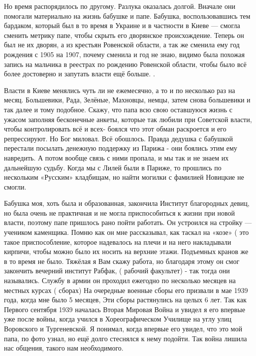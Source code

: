 Но время
распорядилось по другому. Разлука оказалась долгой. Вначале они помогали
материально на жизнь бабушке и папе. Бабушка, воспользовавшись тем бардаком,
который был в то время в  Украине и в частности в Киеве — смогла сменить
метрику папе, чтобы скрыть его дворянское происхождение. Теперь он был не их
дворян, а из крестьян Ровенской области, а так же сменила ему год рождения с
1905 на 1907, почему сменила  и год не знаю, видимо была похожая запись на
мальчика в реестрах по рождению Ровенской области, чтобы было всё более
достоверно и запутать власти ещё больше. . 

Власти в Киеве менялись чуть ли не ежемесячно, а то и по несколько раз на
месяц. Большевики, Рада, Зелёные, Махновцы, немцы, затем снова большевики и так
далее и тому подобное.  Скажу, что папа всю свою оставшуюся жизнь с ужасом
заполняя бесконечные анкеты, которые так любили при Советской власти, чтобы
контролировать всё и всех-  боялся что этот обман раскроется и его
репрессируют.  Но Бог миловал.  Всё обошлось. Правда дедушка с бабушкой
перестали посылать денежную поддержку из Парижа - они боялись этим ему
навредить. А потом вообще связь с ними пропала, и мы так и не знаем их
дальнейшую судьбу. Когда мы с Лилей были в Париже, то прошлись по нескольким
«Русским» кладбищам, но найти могилки с фамилией Новицкие не смогли.  

Бабушка моя, хоть была и образованная, закончила
Институт благородных девиц, но была очень не практичная  и не могла
приспособиться к жизни при новой власти, поэтому папе пришлось рано пойти
работать. Он устроился на стройку — учеником каменщика. Помню как он мне
рассказывал, как таскал на «козе» ( это такое приспособление, которое
надевалось на плечи и на него накладывали кирпичи, чтобы можно было их носить
на верхние этажи. Подъемных кранов же в то время не было. Тяжёлая я Вам скажу
работа, но благодаря этому он смог закончить вечерний институт  Рабфак, (
рабочий факультет) - так  тогда они назывались. Службу в армии он проходил
ежегодно по несколько месяцев  на  местных  курсах ( сборах)  На очередные
военные сборы его призвали  в мае 1939 года, когда мне было 5 месяцев, Эти
сборы растянулись на целых 6 лет. Так как Первого сентября 1939 началась Вторая
Мировая Война и увидел я его впервые уже после войны, когда учился в
Хореографическом Училище на углу улиц Воровского и Тургеневской.  Я понимал,
когда впервые его увидел, что это мой папа, по фото  узнал, но  ещё долго
стеснялся  к нему подойти. Так война лишила нас общения, такого  нам
необходимого.

